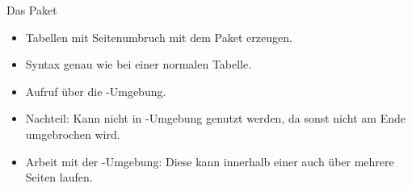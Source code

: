\begin{frame}[fragile]{Das Paket }
\begin{itemize}
\item Tabellen mit Seitenumbruch mit dem Paket  erzeugen.\pause
\item Syntax genau wie bei einer normalen Tabelle. \pause
\item Aufruf über die -Umgebung. \pause
\item Nachteil: Kann nicht in -Umgebung genutzt werden, da sonst nicht am Ende umgebrochen wird.\pause
\item Arbeit mit der -Umgebung: Diese kann innerhalb einer  auch über mehrere Seiten laufen. 
\end{itemize}
\end{frame}